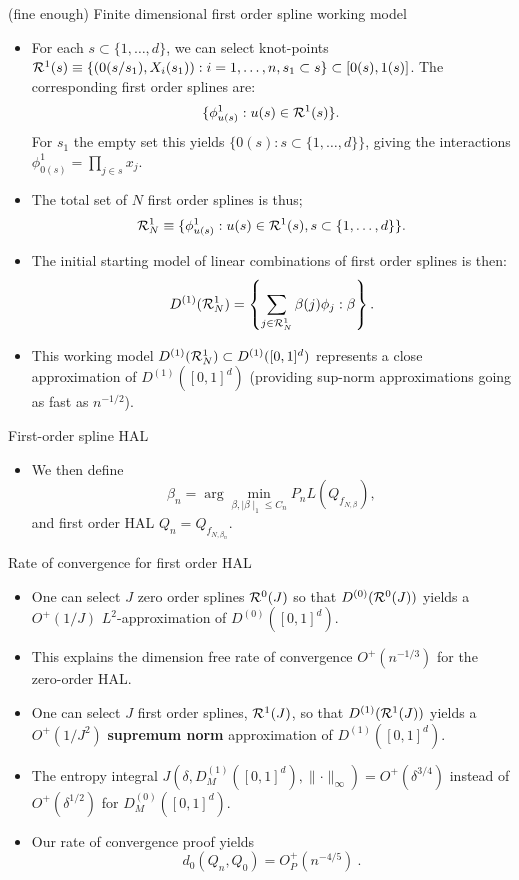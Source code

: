 \documentclass[t]{beamer}
\begin{document}
\begin{frame}{(fine enough) Finite dimensional first order spline working model}
\begin{itemize}
\item For each $s\subset\{1,\ldots,d\}$, we can select knot-points
${\cal R}^1(s)\equiv  \{(0(s/s_1),X_i(s_1)): i=1,\ldots,n,s_1\subset s\}\subset [0(s),1(s)]$. The corresponding first order splines are:
\[
\{\phi^1_{u(s)}: u(s)\in {\cal R}^1(s)\}.\]
For $s_1$ the empty set this yields  $\{0(s): s\subset\{1,\ldots,d\}\}$, giving the interactions $\phi^1_{0(s)}=\prod_{j\in s}x_j$.
\item The total set of $N$ first order splines is thus;
\[
{\cal R}^1_N\equiv \{\phi^1_{u(s)}: u(s)\in {\cal R}^1(s), s\subset \{1,\ldots,d\}\}.\]
\end{itemize}
\end{frame}

\begin{frame}
\begin{itemize}
\item The initial starting model of linear combinations of first order splines is then:
\[
D^{(1)}({\cal R}^1_N)=\left\{\sum_{j\in {\cal R}^1_N}\beta(j)\phi_j: \beta\right\}.\]
\item This working model $D^{(1)}({\cal R}^1_N)\subset D^{(1)}([0,1]^d)$ represents a close approximation of $D^{(1)}([0,1]^d)$ (providing sup-norm approximations going as fast as $n^{-1/2}$).
\end{itemize}
\end{frame}

\begin{frame}{First-order spline HAL}
\begin{itemize}
\item We then define
\[
\beta_n=\arg\min_{\beta,\mid \beta\mid_1\leq C_n} P_n L(Q_{f_{N,\beta}}),\]
and first order HAL $Q_n=Q_{f_{N,\beta_n}}$.
\end{itemize}
\end{frame}

\begin{frame}{Rate of convergence for first order HAL}
\begin{itemize}
\item One can select $J$ zero order splines ${\cal R}^0(J)$ so that  $D^{(0)}({\cal R}^0(J))$ yields a $O^+(1/J)$ $L^2$-approximation of
$D^{(0)}([0,1]^d)$.
\item This explains the dimension free rate of convergence $O^+(n^{-1/3})$ for the zero-order HAL.
\item One can select $J$ first order splines, ${\cal R}^1(J)$, so that $D^{(1)}({\cal R}^1(J))$ yields a $O^+(1/J^2)$ {\bf supremum norm} approximation of $D^{(1)}([0,1]^d)$.
\item The entropy integral $J(\delta, D^{(1)}_M([0,1]^d),\lVert \cdot \rVert_{\infty})=O^+( \delta^{3/4})$ instead of $O^+(\delta^{1/2})$ for $D^{(0)}_M([0,1]^d)$.
\item Our rate of convergence proof  yields
\[
  d_0(Q_n,Q_0)=O_P^+(n^{-4/5}) \ .
\]
\end{itemize}
\end{frame}
\end{document}
